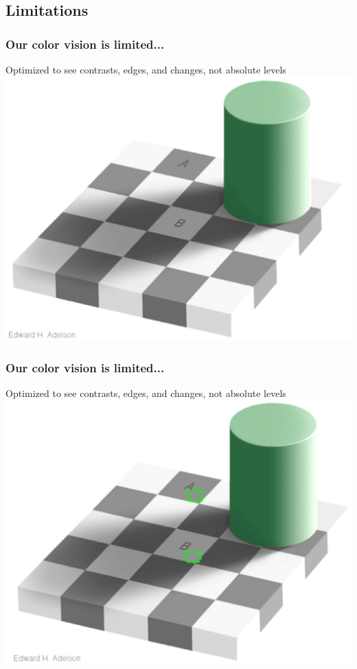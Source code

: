 \documentclass{beamer}
\begin{document}
%
%

\subsection{Limitations}

\begin{frame}
\frametitle{Our color vision is limited...}
Optimized to see contrasts, edges, and changes, not absolute levels
\centering
\includegraphics[width=0.6\linewidth]{image/vision}
\end{frame}

\begin{frame}
\frametitle{Our color vision is limited...}
Optimized to see contrasts, edges, and changes, not absolute levels
\centering
\includegraphics[width=0.6\linewidth]{image/vision2}
\end{frame}
\end{document}
